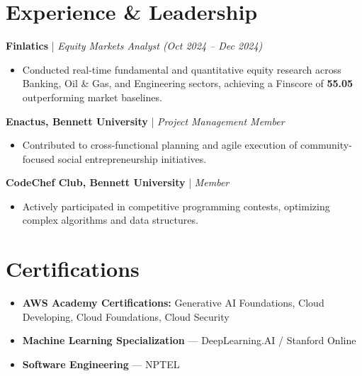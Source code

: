 \documentclass[10pt,a4paper]{article}
\newenvironment{leftcolumn}{\begin{minipage}[t]{0.62\textwidth}}{\end{minipage}\hfill}
\begin{document}
\begin{leftcolumn}
\section*{Experience \& Leadership}

\textbf{Finlatics} | \textit{Equity Markets Analyst (Oct 2024 -- Dec 2024)} \\
\vspace{-15pt}
\begin{itemize}[leftmargin=12pt, itemsep=0pt]
    \item Conducted real-time fundamental and quantitative equity research across Banking, Oil \& Gas, and Engineering sectors, achieving a Finscore of \textbf{55.05} outperforming market baselines.
\end{itemize}
\vspace{-4pt}
\textbf{Enactus, Bennett University} | \textit{Project Management Member} \\
\vspace{-15pt}
\begin{itemize}[leftmargin=12pt, itemsep=0pt]
    \item Contributed to cross-functional planning and agile execution of community-focused social entrepreneurship initiatives.
\end{itemize}
\vspace{-4pt}
\textbf{CodeChef Club, Bennett University} | \textit{Member} \\
\vspace{-15pt}
\begin{itemize}[leftmargin=12pt, itemsep=0pt]
    \item Actively participated in competitive programming contests, optimizing complex algorithms and data structures.
\end{itemize}

\section*{Certifications}
\begin{itemize}[leftmargin=12pt, itemsep=2pt]
    \item \textbf{AWS Academy Certifications:} Generative AI Foundations, Cloud Developing, Cloud Foundations, Cloud Security
    \item \textbf{Machine Learning Specialization} — DeepLearning.AI / Stanford Online
    \item \textbf{Software Engineering} — NPTEL
\end{itemize}

\end{leftcolumn}
\end{document}

